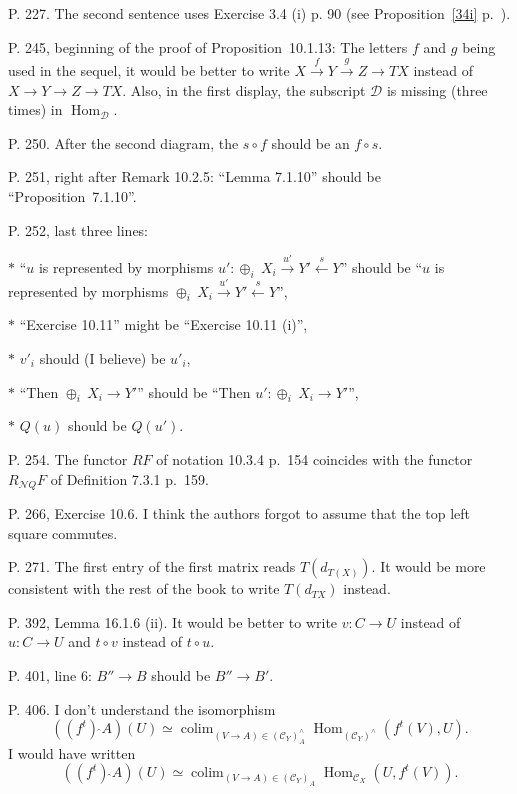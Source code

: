 \documentclass[12pt]{article}
\theoremstyle{remark}%
\newcommand{\n}{\noindent}
\newcommand{\cc}{\mathcal}
\newcommand{\C}{\mathcal C}
\newcommand{\xr}{\xrightarrow}
\newcommand{\pr}{Proposition}
\DeclareMathOperator*{\co}{colim}
\DeclareMathOperator{\h}{Hom}
\begin{document}
\n P. 227. The second sentence uses Exercise 3.4 (i) p. 90 (see Proposition~\ref{34i} p.~\pageref{34i}). 

\n P. 245, beginning of the proof of \pr\ 10.1.13: The letters $f$ and $g$ being used in the sequel, it would be better to write $X\xr fY\xr gZ\to TX$ instead of $X\to Y\to Z\to TX$. Also, in the first display, the subscript $\cc D$ is missing (three times) in $\h_{\cc D}$. 

\n P. 250. After the second diagram, the $s\circ f$ should be an $f\circ s$. 

\n P. 251, right after Remark 10.2.5: ``Lemma 7.1.10'' should be ``\pr\ 7.1.10''.

\n P. 252, last three lines: 

$*$ ``$u$ is represented by morphisms $u':\oplus_i\ X_i\xr{u'}Y'\xleftarrow sY$'' should be ``$u$ is represented by morphisms $\oplus_i\ X_i\xr{u'}Y'\xleftarrow sY$'', 

$*$ ``Exercise 10.11'' might be ``Exercise 10.11 (i)'',

$*$ $v'_i$ should (I believe) be $u'_i$, 

$*$ ``Then $\oplus_i\ X_i\to Y'$'' should be ``Then $u':\oplus_i\ X_i\to Y'$'', 

$*$ $Q(u)$ should be $Q(u')$. 

\n P. 254. The functor $RF$ of notation 10.3.4 p.~154 coincides with the functor $R_{\cc NQ}F$ of Definition 7.3.1 p.~159.

\n P. 266, Exercise 10.6. I think the authors forgot to assume that the top left square commutes. 

\n P. 271. The first entry of the first matrix reads $T(d_{T(X)})$. It would be more consistent with the rest of the book to write $T(d_{TX})$ instead. 

\n P. 392, Lemma 16.1.6 (ii). It would be better to write $v:C\to U$ instead of $u:C\to U$ and $t\circ v$ instead of $t\circ u$. 

\n P. 401, line 6: $B''\to B$ should be $B''\to B'$.

\n P. 406. I don't understand the isomorphism 
$$
\left((f^t)\,\hat{}A\right)(U)\simeq\co_{(V\to A)\in(\C_Y)_A^\wedge}\h_{(\C_Y)^\wedge}(f^t(V),U).
$$ 
I would have written 
$$
\left((f^t)\,\hat{}A\right)(U)\simeq\co_{(V\to A)\in(\C_Y)_A}\h_{\C_X}(U,f^t(V)).
$$
%
\end{document}
